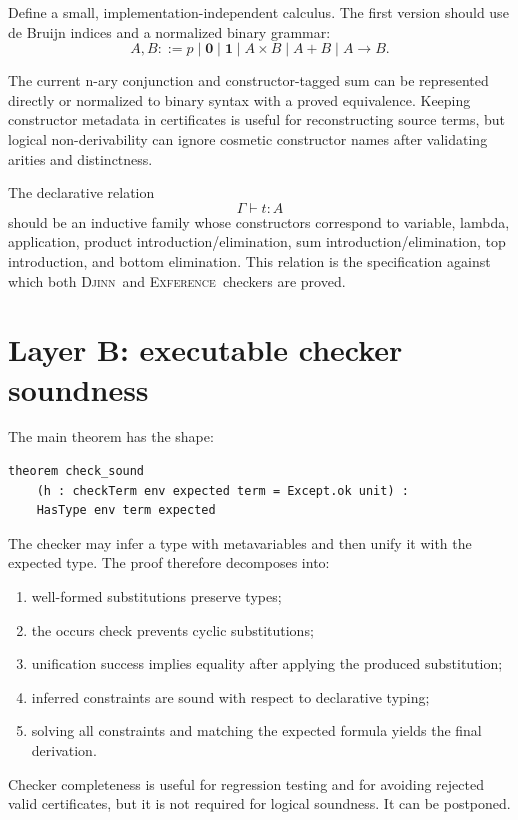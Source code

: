 \documentclass[11pt,letterpaper,openany]{report}
\theoremstyle{definition}
\theoremstyle{remark}
\newcommand{\Djinn}{\textsc{Djinn}}
\newcommand{\Exference}{\textsc{Exference}}
\begin{document}
Define a small, implementation-independent calculus. The first version should use de Bruijn indices and a normalized binary grammar:
\[
 A,B ::= p \mid \mathbf{0} \mid \mathbf{1} \mid A\times B \mid A+B \mid A\to B.
\]

The current n-ary conjunction and constructor-tagged sum can be represented directly or normalized to binary syntax with a proved equivalence. Keeping constructor metadata in certificates is useful for reconstructing source terms, but logical non-derivability can ignore cosmetic constructor names after validating arities and distinctness.

The declarative relation
\[
  \Gamma \vdash t : A
\]
should be an inductive family whose constructors correspond to variable, lambda, application, product introduction/elimination, sum introduction/elimination, top introduction, and bottom elimination. This relation is the specification against which both \Djinn\ and \Exference\ checkers are proved.

\section{Layer B: executable checker soundness}

The main theorem has the shape:

\begin{lstlisting}[language=LeanFour,caption={First central theorem.}]
theorem check_sound
    (h : checkTerm env expected term = Except.ok unit) :
    HasType env term expected
\end{lstlisting}

The checker may infer a type with metavariables and then unify it with the expected type. The proof therefore decomposes into:

\begin{enumerate}
\item well-formed substitutions preserve types;
\item the occurs check prevents cyclic substitutions;
\item unification success implies equality after applying the produced substitution;
\item inferred constraints are sound with respect to declarative typing;
\item solving all constraints and matching the expected formula yields the final derivation.
\end{enumerate}

Checker completeness is useful for regression testing and for avoiding rejected valid certificates, but it is not required for logical soundness. It can be postponed.
\end{document}
